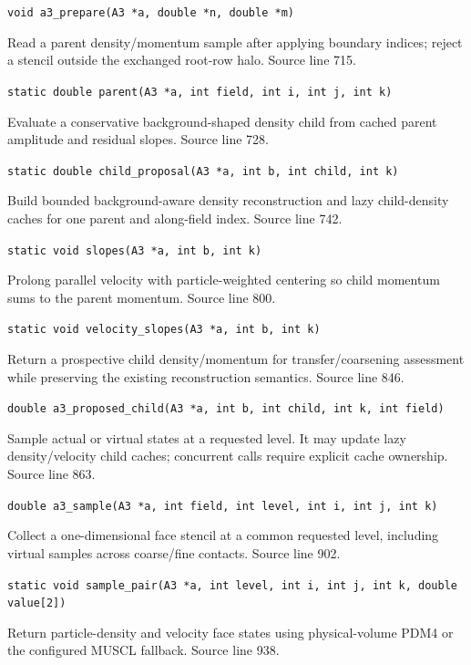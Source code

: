 \begin{description}[style=nextline,leftmargin=0pt,labelindent=0pt,labelwidth=0pt,labelsep=0pt]
{\small\nolinkurl{void a3_prepare(A3 *a, double *n, double *m)}}
\item[\texttt{parent}] Read a parent density/momentum sample after applying boundary indices; reject a stencil outside the exchanged root-row halo. Source line 715.\par
{\small\nolinkurl{static double parent(A3 *a, int field, int i, int j, int k)}}
\item[\texttt{child\_proposal}] Evaluate a conservative background-shaped density child from cached parent amplitude and residual slopes. Source line 728.\par
{\small\nolinkurl{static double child_proposal(A3 *a, int b, int child, int k)}}
\item[\texttt{slopes}] Build bounded background-aware density reconstruction and lazy child-density caches for one parent and along-field index. Source line 742.\par
{\small\nolinkurl{static void slopes(A3 *a, int b, int k)}}
\item[\texttt{velocity\_slopes}] Prolong parallel velocity with particle-weighted centering so child momentum sums to the parent momentum. Source line 800.\par
{\small\nolinkurl{static void velocity_slopes(A3 *a, int b, int k)}}
\item[\texttt{a3\_proposed\_child}] Return a prospective child density/momentum for transfer/coarsening assessment while preserving the existing reconstruction semantics. Source line 846.\par
{\small\nolinkurl{double a3_proposed_child(A3 *a, int b, int child, int k, int field)}}
\item[\texttt{a3\_sample}] Sample actual or virtual states at a requested level. It may update lazy density/velocity child caches; concurrent calls require explicit cache ownership. Source line 863.\par
{\small\nolinkurl{double a3_sample(A3 *a, int field, int level, int i, int j, int k)}}
\item[\texttt{sample\_pair}] Collect a one-dimensional face stencil at a common requested level, including virtual samples across coarse/fine contacts. Source line 902.\par
{\small\nolinkurl{static void sample_pair(A3 *a, int level, int i, int j, int k, double value[2])}}
\item[\texttt{a3\_face\_pair}] Return particle-density and velocity face states using physical-volume PDM4 or the configured MUSCL fallback. Source line 938.\par

\end{description}
